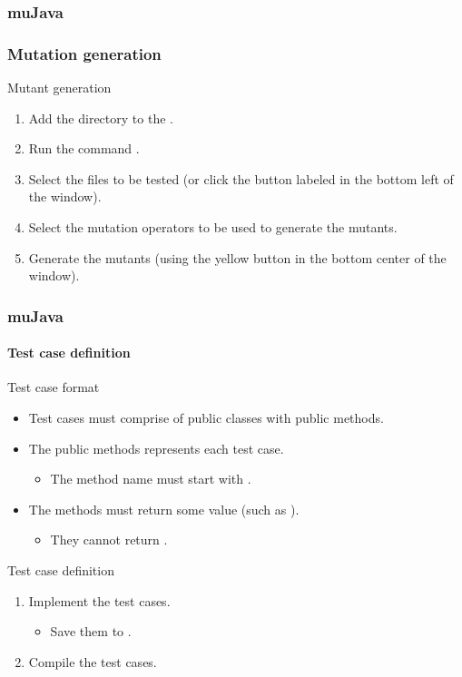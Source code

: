 \begin{frame}
\frametitle{muJava}
\frametitle{Mutation generation}

\begin{block:procedure}{Mutant generation}
\begin{enumerate}
	\item Add the directory  to the
	.

	\item Run the command .

	\item Select the files to be tested (or click the button labeled
	 in the bottom left of the window).

	\item Select the mutation operators to be used to generate the mutants.

	\item Generate the mutants (using the yellow button in the bottom center
	of the window).
\end{enumerate}
\end{block:procedure}
\end{frame}


\begin{frame}
\frametitle{muJava}
\framesubtitle{Test case definition}

\begin{block:fact}{Test case format}
\begin{itemize}
	\item Test cases must comprise of public classes with public methods.

	\item The public methods represents each test case.
	\begin{itemize}
		\item The method name must start with .
	\end{itemize}

	\item The methods must return some value (such as ).
	\begin{itemize}
		\item They cannot return .
	\end{itemize}
\end{itemize}
\end{block:fact}


\begin{block:procedure}{Test case definition}
\begin{enumerate}
	\item Implement the test cases.
	\begin{itemize}
		\item Save them to .
	\end{itemize}

	\item Compile the test cases.
\end{enumerate}
\end{block:procedure}
\end{frame}


